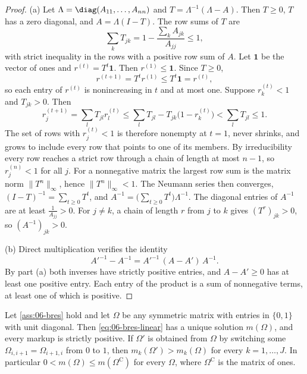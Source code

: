\begin{proof}
(a) Let $\Lambda = \diag(A_{11},\dots,A_{nn})$ and $T = \Lambda^{-1}(\Lambda - A)$. Then $T \ge 0$, $T$ has a zero
diagonal, and $A = \Lambda(I - T)$. The row sums of $T$ are
\begin{equation*}
  \sum_k T_{jk} = 1 - \frac{\sum_k A_{jk}}{A_{jj}} \le 1,
\end{equation*}
with strict inequality in the rows with a positive row sum of $A$. Let $\mathbf 1$ be the vector of ones and
$r^{(t)} = T^t\mathbf 1$. Then $r^{(1)} \le \mathbf 1$. Since $T \ge 0$,
\begin{equation*}
  r^{(t+1)} = T^t r^{(1)} \le T^t\mathbf 1 = r^{(t)},
\end{equation*}
so each entry of $r^{(t)}$ is nonincreasing in $t$ and at most one. Suppose $r^{(t)}_k < 1$ and $T_{jk} > 0$. Then
\begin{equation*}
  r^{(t+1)}_j = \sum_l T_{jl}r^{(t)}_l \le \sum_l T_{jl} - T_{jk}\bigl(1 - r^{(t)}_k\bigr) < \sum_l T_{jl} \le 1 .
\end{equation*}
The set of rows with $r^{(t)}_j < 1$ is therefore nonempty at $t = 1$, never shrinks, and grows to include every row
that points to one of its members. By irreducibility every row reaches a strict row through a chain of length at
most $n - 1$, so $r^{(n)}_j < 1$ for all $j$. For a nonnegative matrix the largest row sum is the matrix norm
$\|T^n\|_\infty$, hence $\|T^n\|_\infty < 1$. The Neumann series then converges, $(I - T)^{-1} = \sum_{t\ge0}T^t$, and
$A^{-1} = \bigl(\sum_{t\ge0}T^t\bigr)\Lambda^{-1}$. The diagonal entries of $A^{-1}$ are at least $\frac{1}{A_{jj}} > 0$.
For $j \ne k$, a chain of length $r$ from $j$ to $k$ gives $(T^r)_{jk} > 0$, so $(A^{-1})_{jk} > 0$.

(b) Direct multiplication verifies the identity
\begin{equation*}
  A'^{-1} - A^{-1} = A'^{-1}\,(A - A')\,A^{-1}.
\end{equation*}
By part (a) both inverses have strictly positive entries, and $A - A' \ge 0$ has at least one positive entry. Each
entry of the product is a sum of nonnegative terms, at least one of which is positive.
\end{proof}

\begin{proposition}\label{prop:06-cooperation-monotone}
Let \cref{ass:06-bres} hold and let $\Omega$ be any symmetric matrix with entries in $\{0,1\}$ with unit diagonal. Then
\eqref{eq:06-bres-linear} has a unique solution $m(\Omega)$, and every markup is strictly positive. If $\Omega'$ is
obtained from $\Omega$ by switching some $\Omega_{i,i+1} = \Omega_{i+1,i}$ from $0$ to $1$, then
$m_k(\Omega') > m_k(\Omega)$ for every $k = 1,\dots,J$. In particular $0 < m(\Omega) \le m(\Omega^{\mathrm C})$ for
every $\Omega$, where $\Omega^{\mathrm C}$ is the matrix of ones.
\end{proposition}

